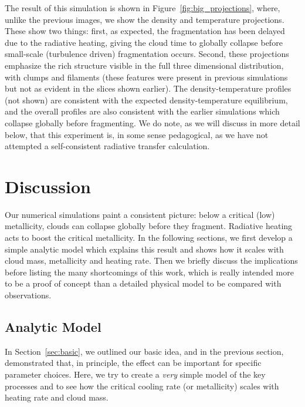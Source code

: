 \documentclass[useAMS,usenatbib]{mn2e}
\begin{document}
The result of this simulation is shown in Figure~\ref{fig:big_projections}, where, unlike the previous images, we show the density and temperature projections.
These show two things: first, as expected, the fragmentation has been delayed due to the radiative heating, giving the cloud time to globally collapse before
small-scale (turbulence driven) fragmentation occurs.  Second, these projections emphasize the rich structure visible in the full three dimensional distribution,
with clumps and filaments (these features were present in previous simulations but not as evident in the slices shown earlier). The density-temperature
profiles (not shown) are consistent with the expected density-temperature equilibrium, and the overall profiles are also consistent with the earlier simulations
which collapse globally before fragmenting.  We do note, as we will discuss in more detail below, that this experiment is, in some sense pedagogical, as we
have not attempted a self-consistent radiative transfer calculation.


% 
\section{Discussion}
\label{sec:discussion}

Our numerical simulations paint a consistent picture: below a critical (low) metallicity, clouds can collapse globally before they fragment.  Radiative heating acts to boost the critical metallicity.  In the following sections, we first develop a simple analytic model which explains this result and shows how it scales with cloud mass, metallicity and heating rate.  Then we briefly discuss the implications before listing the many shortcomings of this work, which is really intended more to be a proof of concept than a detailed physical model to be compared with observations.

\subsection{Analytic Model}

In Section~\ref{sec:basic}, we outlined our basic idea, and in the previous section, demonstrated that, in principle, the effect can be important for specific parameter choices.  Here, we try to create a {\it very} simple model of the key processes and to see how the critical cooling rate (or metallicity) scales with heating rate and cloud mass.
\end{document}
